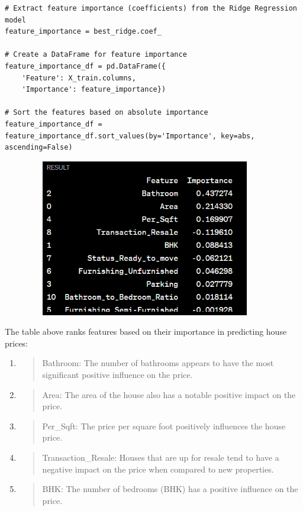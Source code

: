 \documentclass[]{article}
\begin{document}
\begin{verbatim}
# Extract feature importance (coefficients) from the Ridge Regression model
feature_importance = best_ridge.coef_

# Create a DataFrame for feature importance
feature_importance_df = pd.DataFrame({
    'Feature': X_train.columns,
    'Importance': feature_importance})

# Sort the features based on absolute importance
feature_importance_df = 
feature_importance_df.sort_values(by='Importance', key=abs, ascending=False)

\end{verbatim}
\includegraphics[width=4.925in,height=2.70833in]{image2.png}

The table above ranks features based on their importance in predicting
house prices:

\begin{enumerate}
\def\labelenumi{\arabic{enumi}.}
\item
  \begin{quote}
  Bathroom: The number of bathrooms appears to have the most significant
  positive influence on the price.
  \end{quote}
\item
  \begin{quote}
  Area: The area of the house also has a notable positive impact on the
  price.
  \end{quote}
\item
  \begin{quote}
  Per\_Sqft: The price per square foot positively influences the house
  price.
  \end{quote}
\item
  \begin{quote}
  Transaction\_Resale: Houses that are up for resale tend to have a
  negative impact on the price when compared to new properties.
  \end{quote}
\item
  \begin{quote}
  BHK: The number of bedrooms (BHK) has a positive influence on the
  price.
  \end{quote}
\end{enumerate}
\end{document}

